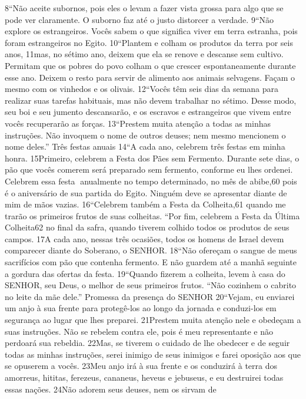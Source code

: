    8“Não aceite subornos, pois eles o levam a fazer vista grossa para algo que se
pode ver claramente. O suborno faz até o justo distorcer a verdade.
   9“Não explore os estrangeiros. Vocês sabem o que significa viver em terra
estranha, pois foram estrangeiros no Egito.
   10“Plantem e colham os produtos da terra por seis anos, 11mas, no sétimo ano,
deixem que ela se renove e descanse sem cultivo. Permitam que os pobres do
povo colham o que crescer espontaneamente durante esse ano. Deixem o resto
para servir de alimento aos animais selvagens. Façam o mesmo com os vinhedos e
os olivais.
   12“Vocês têm seis dias da semana para realizar suas tarefas habituais, mas não
devem trabalhar no sétimo. Desse modo, seu boi e seu jumento descansarão, e os
escravos e estrangeiros que vivem entre vocês recuperarão as forças.
   13“Prestem muita atenção a todas as minhas instruções. Não invoquem o nome
de outros deuses; nem mesmo mencionem o nome deles.”
Três festas anuais
14“A cada ano, celebrem três festas em minha honra. 15Primeiro, celebrem a Festa
dos Pães sem Fermento. Durante sete dias, o pão que vocês comerem será
preparado sem fermento, conforme eu lhes ordenei. Celebrem essa festa
anualmente no tempo determinado, no mês de abibe,60 pois é o aniversário de sua
partida do Egito. Ninguém deve se apresentar diante de mim de mãos vazias.
   16“Celebrem também a Festa da Colheita,61 quando me trarão os primeiros
frutos de suas colheitas.
   “Por fim, celebrem a Festa da Última Colheita62 no final da safra, quando
tiverem colhido todos os produtos de seus campos. 17A cada ano, nessas três
ocasiões, todos os homens de Israel devem comparecer diante do Soberano, o
SENHOR.
   18“Não ofereçam o sangue de meus sacrifícios com pão que contenha
fermento. E não guardem até a manhã seguinte a gordura das ofertas da festa.
   19“Quando fizerem a colheita, levem à casa do SENHOR, seu Deus, o melhor de
seus primeiros frutos.
   “Não cozinhem o cabrito no leite da mãe dele.”
Promessa da presença do SENHOR
20“Vejam, eu enviarei um anjo à sua frente para protegê-los ao longo da jornada e
conduzi-los em segurança ao lugar que lhes preparei. 21Prestem muita atenção
nele e obedeçam a suas instruções. Não se rebelem contra ele, pois é meu
representante e não perdoará sua rebeldia. 22Mas, se tiverem o cuidado de lhe
obedecer e de seguir todas as minhas instruções, serei inimigo de seus inimigos e
farei oposição aos que se opuserem a vocês. 23Meu anjo irá à sua frente e os
conduzirá à terra dos amorreus, hititas, ferezeus, cananeus, heveus e jebuseus, e
eu destruirei todas essas nações. 24Não adorem seus deuses, nem os sirvam de
